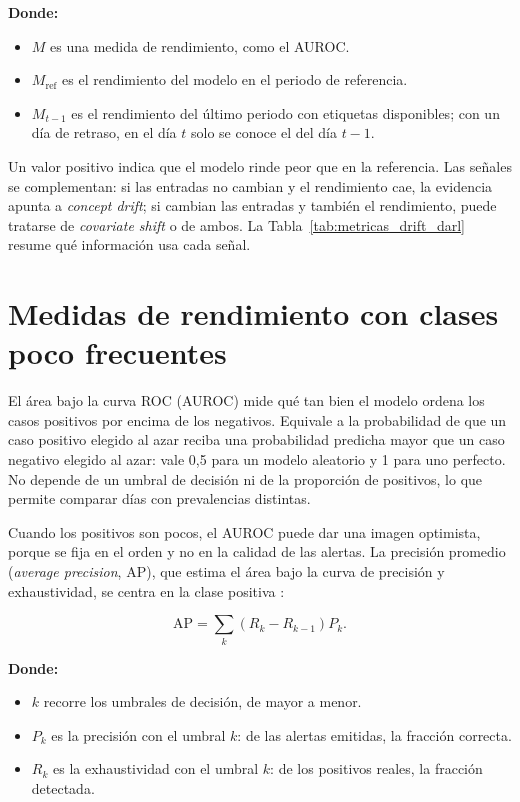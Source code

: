 \noindent\textbf{Donde:}
\begin{itemize}
    \item $M$ es una medida de rendimiento, como el AUROC.
    \item $M_{\text{ref}}$ es el rendimiento del modelo en el periodo de referencia.
    \item $M_{t-1}$ es el rendimiento del último periodo con etiquetas disponibles; con un día de retraso, en el día $t$ solo se conoce el del día $t-1$.
\end{itemize}

Un valor positivo indica que el modelo rinde peor que en la referencia. Las señales se
complementan: si las entradas no cambian y el rendimiento cae, la evidencia apunta a
\textit{concept drift}; si cambian las entradas y también el rendimiento, puede tratarse de
\textit{covariate shift} o de ambos. La Tabla~\ref{tab:metricas_drift_darl} resume qué
información usa cada señal.



\section{Medidas de rendimiento con clases poco frecuentes}

El área bajo la curva ROC (AUROC) mide qué tan bien el modelo ordena los casos positivos por
encima de los negativos. Equivale a la probabilidad de que un caso positivo elegido al azar
reciba una probabilidad predicha mayor que un caso negativo elegido al azar: vale 0,5 para
un modelo aleatorio y 1 para uno perfecto. No depende de un umbral de decisión ni de la
proporción de positivos, lo que permite comparar días con prevalencias distintas.

Cuando los positivos son pocos, el AUROC puede dar una imagen optimista, porque se fija en el
orden y no en la calidad de las alertas. La precisión promedio (\textit{average precision},
AP), que estima el área bajo la curva de precisión y exhaustividad, se centra en la clase
positiva \cite{saito2015prc}:

\begin{equation}
    \text{AP} = \sum_{k} \left(R_k - R_{k-1}\right) P_k.
    \label{eq:auprc}
\end{equation}

\noindent\textbf{Donde:}
\begin{itemize}
    \item $k$ recorre los umbrales de decisión, de mayor a menor.
    \item $P_k$ es la precisión con el umbral $k$: de las alertas emitidas, la fracción correcta.
    \item $R_k$ es la exhaustividad con el umbral $k$: de los positivos reales, la fracción detectada.
\end{itemize}

